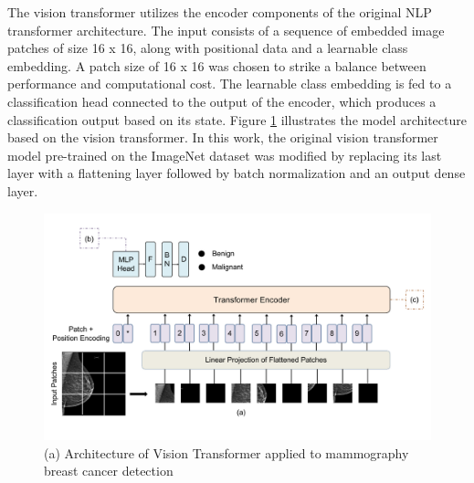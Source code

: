 \documentclass{article}
\begin{document}
 The vision transformer utilizes the encoder components of the original NLP transformer architecture. The input consists of a sequence of embedded image patches of size 16 x 16, along with positional data and a learnable class embedding. A patch size of 16 x 16 was chosen to strike a balance between performance and computational cost. The learnable class embedding is fed to a classification head connected to the output of the encoder, which produces a classification output based on its state. Figure \ref{fig.vit} illustrates the model architecture based on the vision transformer. In this work, the original vision transformer model pre-trained on the ImageNet dataset was modified by replacing its last layer with a flattening layer followed by batch normalization and an output dense layer.

\begin{figure}[h!]
\begin{flushleft}
\includegraphics[width=\textwidth]{Figures/Vit_Archi_resize.pdf}
\caption{(a) Architecture of Vision Transformer applied to mammography breast cancer detection}
\label{fig.vit}
\end{flushleft}
\end{figure}
\end{document}
